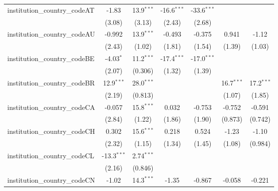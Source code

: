 \begin{tabular}{lcccccc}
   institution\_country\_codeAT          & -1.83         & 13.9$^{***}$  & -16.6$^{***}$ & -33.6$^{***}$ &               &   \\   
                                         & (3.08)        & (3.13)        & (2.43)        & (2.68)        &               &   \\   
   institution\_country\_codeAU          & -0.992        & 13.9$^{***}$  & -0.493        & -0.375        & 0.941         & -1.12\\   
                                         & (2.43)        & (1.02)        & (1.81)        & (1.54)        & (1.39)        & (1.03)\\   
   institution\_country\_codeBE          & -4.03$^{*}$   & 11.2$^{***}$  & -17.4$^{***}$ & -17.0$^{***}$ &               &   \\   
                                         & (2.07)        & (0.306)       & (1.32)        & (1.39)        &               &   \\   
   institution\_country\_codeBR          & 12.9$^{***}$  & 28.0$^{***}$  &               &               & 16.7$^{***}$  & 17.2$^{***}$\\   
                                         & (2.19)        & (0.813)       &               &               & (1.07)        & (1.85)\\   
   institution\_country\_codeCA          & -0.057        & 15.8$^{***}$  & 0.032         & -0.753        & -0.752        & -0.591\\   
                                         & (2.84)        & (1.22)        & (1.86)        & (1.90)        & (0.873)       & (0.742)\\   
   institution\_country\_codeCH          & 0.302         & 15.6$^{***}$  & 0.218         & 0.524         & -1.23         & -1.10\\   
                                         & (2.32)        & (1.15)        & (1.34)        & (1.45)        & (1.08)        & (0.984)\\   
   institution\_country\_codeCL          & -13.3$^{***}$ & 2.74$^{***}$  &               &               &               &   \\   
                                         & (2.16)        & (0.846)       &               &               &               &   \\   
   institution\_country\_codeCN          & -1.02         & 14.3$^{***}$  & -1.35         & -0.867        & -0.058        & -0.221\\   

\end{tabular}

